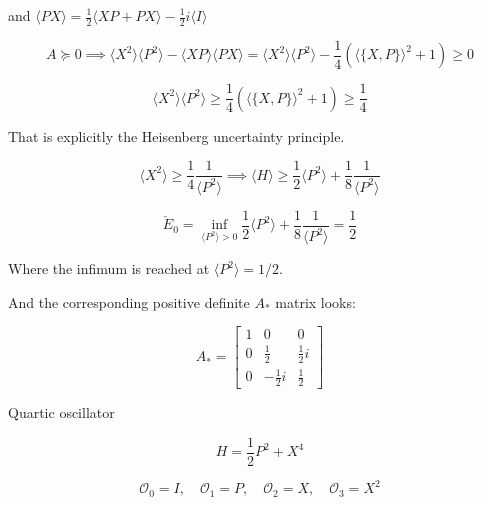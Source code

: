 \documentclass{article}
\theoremstyle{definition}
\begin{document}
and $\langle PX \rangle = \frac{1}{2} \langle X P+PX \rangle - \frac{1}{2} i \langle I \rangle$

\begin{equation}
    A \succcurlyeq 0
    \implies
    \langle X^2 \rangle \langle P^2 \rangle - \langle XP \rangle \langle PX \rangle
    =
    \langle X^2 \rangle \langle P^2 \rangle - \frac{1}{4} (\langle \{X,P\} \rangle^2+1)
    \ge0
\end{equation}

\begin{equation}
    \langle X^2 \rangle \langle P^2 \rangle 
    \ge
    \frac{1}{4} (\langle \{X,P\} \rangle^2+1)
    \ge
    \frac{1}{4}
\end{equation}

That is explicitly the Heisenberg uncertainty principle.

\begin{equation}
    \langle X^2 \rangle 
    \ge
    \frac{1}{4} \frac{1}{\langle P^2 \rangle }
    \implies
    \langle H \rangle \ge \frac{1}{2} \langle P^2 \rangle + \frac{1}{8} \frac{1}{\langle P^2 \rangle }
\end{equation}

\begin{equation}
    \check{E}_0
    =
    \inf_{\langle P^2 \rangle >0} 
    \frac{1}{2} \langle P^2 \rangle + \frac{1}{8} \frac{1}{\langle P^2 \rangle }
    =
    \frac{1}{2}
\end{equation}

Where the infimum is reached at $\langle P^2 \rangle=1/2$.

And the corresponding positive definite $A_*$ matrix looks:

\begin{equation}
    A_*=
    \begin{bmatrix}
        1 & 0 & 0 \\
        0 & \frac{1}{2} & \frac{1}{2} i \\
        0 & -\frac{1}{2} i & \frac{1}{2} 
    \end{bmatrix}
\end{equation}

Quartic oscillator

\begin{equation}
    H=\frac{1}{2} P^2 + X^4
\end{equation}

\begin{equation}
    \mathcal{O_0}=I, \quad \mathcal{O}_1=P, \quad \mathcal{O}_2 = X, \quad \mathcal{O}_3=X^2
\end{equation}
\end{document}
